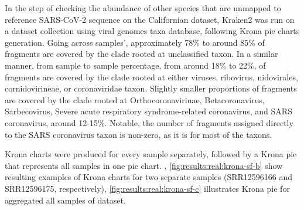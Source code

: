     In the step of checking the abundance of other species that are unmapped to reference SARS-CoV-2 sequence on the Californian dataset, Kraken2 was run on a dataset collection using viral genomes taxa database, following Krona pie charts generation. Going across samples’, approximately 78\% to around 85\% of fragments are covered by the clade rooted at unclassified taxon. In a similar manner, from sample to sample percentage, from around 18\% to 22\%, of fragments are covered by the clade rooted at either viruses, ribovirus, nidovirales, cornidovirineae, or coronaviridae taxon. Slightly smaller proportions of fragments are covered by the clade rooted at Orthocoronavirinae, Betacoronavirus, Sarbecovirus, Severe acute respiratory syndrome-related coronavirus, and SARS coronavirus, around 12-15\%. Notable, the number of fragments assigned directly to the SARS coronavirus taxon is non-zero, as it is for most of the taxons. 
    
    Krona charts were produced for every sample separately, followed by a Krona pie that represents all samples in one pie chart. , \ref{fig:results:real:krona-sf-b} show resulting examples of Krona charts for two separate samples (SRR12596166 and SRR12596175, respectively), \cref{fig:results:real:krona-sf-c} illustrates Krona pie for aggregated all samples of dataset. 
    
